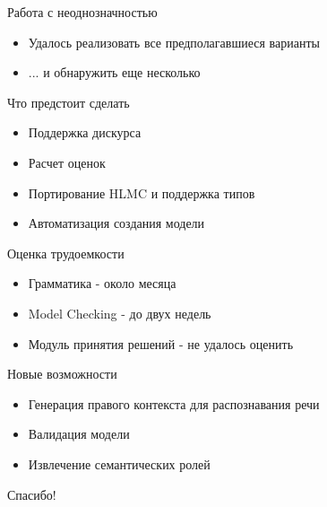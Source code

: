\documentclass{beamer}
\begin{document}
\begin{frame}{Работа с неоднозначностью}
\begin{itemize}
	\item Удалось реализовать все предполагавшиеся варианты
	\item ... и обнаружить еще несколько
\end{itemize}
\end{frame}

\begin{frame}{Что предстоит сделать}
\begin{itemize}
	\item Поддержка дискурса
	\item Расчет оценок
	\item Портирование HLMC и поддержка типов
	\item Автоматизация создания модели
\end{itemize}
\end{frame}

\begin{frame}{Оценка трудоемкости}
\begin{itemize}
	\item Грамматика - около месяца
	\item Model Checking - до двух недель
	\item Модуль принятия решений - не удалось оценить
\end{itemize}
\end{frame}

\begin{frame}{Новые возможности}
\begin{itemize}
	\item Генерация правого контекста для распознавания речи
	\item Валидация модели
	\item Извлечение семантических ролей
\end{itemize}
\end{frame}

\begin{frame}{}
    \thispagestyle{empty}
    \begin{center}
        {\large Спасибо!}
    \end{center}
\end{frame}


\end{document}
